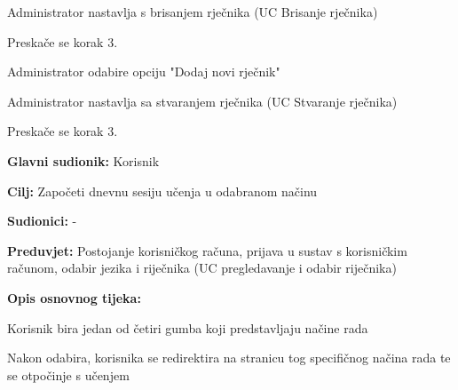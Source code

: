 \begin{packed_item}
\begin{packed_item}
\begin{packed_enum}
			\item Administrator nastavlja s brisanjem rječnika (UC Brisanje rječnika)
			\item Preskače se korak 3.
			
		\end{packed_enum}
		\item[2.b] Administrator odabire opciju "Dodaj novi rječnik"
		\item[] \begin{packed_enum}
			
			\item Administrator nastavlja sa stvaranjem rječnika (UC Stvaranje rječnika)
			\item Preskače se korak 3.
			
		\end{packed_enum}
		
	\end{packed_item}
	
\end{packed_item}


\noindent {}
\begin{packed_item}

	\item \textbf{Glavni sudionik: } Korisnik
	\item \textbf{Cilj: } Započeti dnevnu sesiju učenja u odabranom načinu
	\item \textbf{Sudionici: } -
	\item \textbf{Preduvjet: } Postojanje korisničkog računa, prijava u sustav s korisničkim računom, odabir jezika i riječnika (UC pregledavanje i odabir riječnika)
	\item  \textbf{Opis osnovnog tijeka:}
	
	\item[] \begin{packed_enum}
		
		\item Korisnik bira jedan od četiri gumba koji predstavljaju načine rada
		\item Nakon odabira, korisnika se redirektira na stranicu tog specifičnog
		načina rada te se otpočinje s učenjem

	\end{packed_enum}

	
\end{packed_item}



